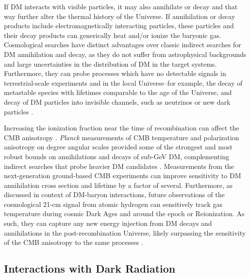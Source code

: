 \documentclass[12pt]{article}
\begin{document}
If DM interacts with visible particles, it may also annihilate or decay and that way further alter the thermal history of the Universe. 
If annihilation or decay products include electromagnetically interacting particles, these particles and their decay products can generically heat and/or ionize the baryonic gas.
Cosmological searches have distinct advantages over classic indirect searches for DM annihilation and decay, as they do not suffer from astrophysical backgrounds and large uncertainties in the distribution of DM in the target systems.
Furthermore, they can probe processes which have no detectable signals in terrestrial-scale experiments and in the local Universe--for example, the decay of metastable species with lifetimes comparable to the age of the Universe, and decay of DM particles into invisible channels, such as neutrinos or new dark particles \cite{Poulin:2016nat,Poulin:2016anj}. 

Increasing the ionization fraction near the time of recombination can affect the CMB anisotropy \cite{Adams:1998nr,Chen:2003gz, Padmanabhan:2005es}. 
\textit{Planck} measurements of CMB temperature and polarization anisotropy on degree angular scales provided some of the strongest and most robust bounds on annihilations and decays of sub-GeV DM, complementing indirect searches that probe heavier DM candidates \cite{Aghanim:2018eyx,Slatyer:2016qyl}. 
Measurements from the next-generation ground-based CMB experiments can improve sensitivity to DM annihilation cross section and lifetime by a factor of several.
Furthermore, as discussed in context of DM-baryon interactions, future observations of the cosmological 21-cm signal from atomic hydrogen can sensitively track gas temperature during cosmic Dark Ages and around the epoch or Reionization.
As such, they can capture any new energy injection from DM decays and annihilations in the post-recombination Universe, likely surpassing the sensitivity of the CMB anisotropy to the same processes \cite{Furlanetto:2006wp,Valdes:2007cu,Evoli:2014pva,Lopez-Honorez:2016sur,Poulin:2016anj}. 

\vspace{-0.4cm}
\subsection{Interactions with Dark Radiation}
\end{document}
